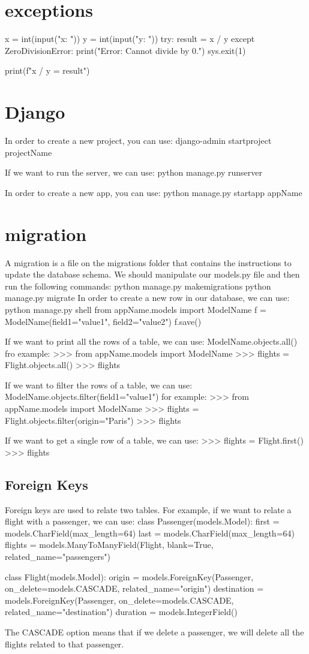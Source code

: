 \documentclass[12pt]{article}
\begin{document}
\section{exceptions}
x = int(input("x: "))
y = int(input("y: "))
try:
    result = x / y
except ZeroDivisionError:
    print("Error: Cannot divide by 0.")
    sys.exit(1)

print(f"{x} / {y} = {result}")


\section{Django}
In order to create a new project, you can use:
django-admin startproject projectName

If we want to run the server, we can use:
python manage.py runserver

In order to create a new app, you can use:
python manage.py startapp appName

\section{migration}
A migration is a file on the migrations folder that contains the instructions to update the database schema.
We should manipulate our models.py file and then run the following commands:
python manage.py makemigrations
python manage.py migrate
In order to create a new row in our database, we can use:
python manage.py shell
from appName.models import ModelName
f = ModelName(field1="value1", field2="value2")
f.save()

If we want to print all the rows of a table, we can use:
ModelName.objects.all() fro example:
>>> from appName.models import ModelName
>>> flights = Flight.objects.all()
>>> flights

If we want to filter the rows of a table, we can use:
ModelName.objects.filter(field1="value1") for example:
>>> from appName.models import ModelName
>>> flights = Flight.objects.filter(origin="Paris")
>>> flights

If we want to get a single row of a table, we can use:
>>> flights = Flight.first()
>>> flights

\subsection{Foreign Keys}
Foreign keys are used to relate two tables. For example, if we want to relate a flight with a passenger, we can use:
class Passenger(models.Model):
    first = models.CharField(max_length=64)
    last = models.CharField(max_length=64)
    flights = models.ManyToManyField(Flight, blank=True, related_name="passengers")

class Flight(models.Model):
    origin = models.ForeignKey(Passenger, on_delete=models.CASCADE, related_name="origin")
    destination = models.ForeignKey(Passenger, on_delete=models.CASCADE, related_name="destination")
    duration = models.IntegerField()

The CASCADE option means that if we delete a passenger, we will delete all the flights related to that passenger.
\end{document}
